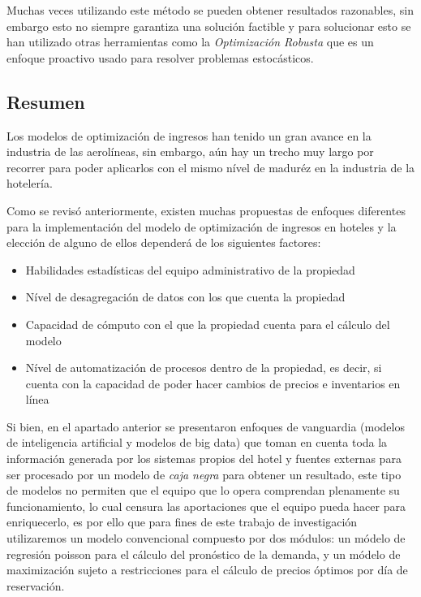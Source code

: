 {{{Muchas veces utilizando este método se pueden obtener resultados razonables, sin embargo esto no siempre garantiza una solución factible y para solucionar esto se han utilizado otras herramientas como la \emph{Optimización Robusta} que es un enfoque proactivo usado para resolver problemas estocásticos.

\subsection*{Resumen}

Los modelos de optimización de ingresos han tenido un gran avance en la industria de las aerolíneas, sin embargo, aún hay un trecho muy largo por recorrer para poder aplicarlos con el mismo nível de maduréz en la industria de la hotelería.

Como se revisó anteriormente, existen muchas propuestas de enfoques diferentes para la implementación del modelo de optimización de ingresos en hoteles y la elección de alguno de ellos dependerá de los siguientes factores:

\begin{itemize}
  \item Habilidades estadísticas del equipo administrativo de la propiedad
  \item Nível de desagregación de datos con los que cuenta la propiedad
  \item Capacidad de cómputo con el que la propiedad cuenta para el cálculo del modelo
  \item Nível de automatización de procesos dentro de la propiedad, es decir, si cuenta con la capacidad de poder hacer cambios de precios e inventarios en línea
\end{itemize}

Si bien, en el apartado anterior se presentaron enfoques de vanguardia (modelos de inteligencia artificial y modelos de big data) que toman en cuenta toda la información generada por los sistemas propios del hotel y fuentes externas para ser procesado por un modelo de \emph{caja negra} para obtener un resultado, este tipo de modelos no permiten que el equipo que lo opera comprendan plenamente su funcionamiento, lo cual censura las aportaciones que el equipo pueda hacer para enriquecerlo, es por ello que para fines de este trabajo de investigación utilizaremos un modelo convencional compuesto por dos módulos: un módelo de regresión poisson para el cálculo del pronóstico de la demanda, y un módelo de maximización sujeto a restricciones para el cálculo de precios óptimos por día de reservación.

}}}

